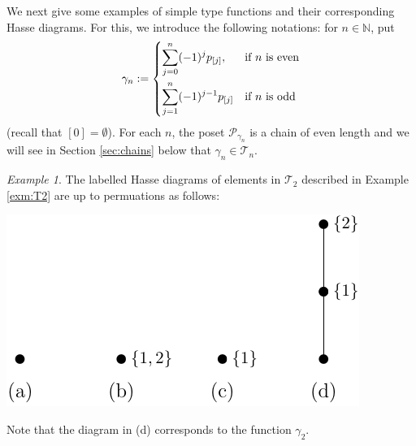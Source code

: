 \documentclass[12pt]{article}
\theoremstyle{definition}
\theoremstyle{remark}
\newtheorem{exm}{Example}
\def\Te{\mathcal T}
\def\Pe{\mathcal P}
\begin{document}
We next give some examples of simple type functions and their corresponding Hasse
diagrams. For this, we introduce the following notations: for $n\in \mathbb N$, put
\begin{equation}\label{eq:gammas}
\gamma_n:= \begin{dcases} \sum_{j=0}^n (-1)^jp_{[j]}, & \text{if $n$ is even}\\
\sum_{j=1}^n (-1)^{j-1}p_{[j]} & \text{if $n$ is odd}
\end{dcases}
\end{equation}
{\color{red} (recall that $[0]=\emptyset$)}. For each $n$, the poset $\Pe_{\gamma_n}$ is a chain of even
length and we will see in Section  \ref{sec:chains} below that $\gamma_n\in \Te_n$. 

\begin{exm} \label{exm:T2hasse} The labelled Hasse diagrams of elements in $\Te_2$
described in Example \ref{exm:T2} are up
to permuations as
follows:
\begin{center}
\includegraphics[scale=0.8]{t2_hasse.pdf}
\end{center}

Note that the diagram in (d) corresponds to the function $\gamma_2$.


\end{exm}
\end{document}
